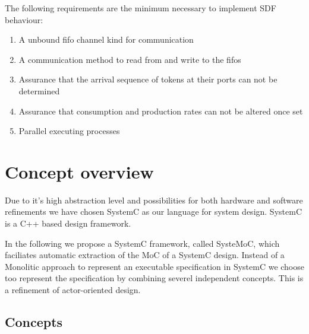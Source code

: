 The following requirements are the minimum necessary to
implement SDF behaviour:

\begin{enumerate}
\item A unbound fifo channel kind for communication
\item A communication method to read from and write to the fifos
\item Assurance that the arrival sequence of tokens at
      their ports can not be determined
\item Assurance that consumption and production rates can not
      be altered once set
\item Parallel executing processes
\end{enumerate}


\section{Concept overview}

Due to it's high abstraction level and possibilities for both
hardware and software refinements we have chosen SystemC
\cite{systemc-lrm:2003} \cite{glms:2002} as our language for system design.
SystemC is a C++ based design framework.

In the following we propose a SystemC framework, called SysteMoC, which
faciliates automatic extraction of the MoC of a SystemC design.
Instead of a Monolitic approach to represent an executable specification
in SystemC we choose too represent the specification
by combining severel independent concepts. This is a refinement of
actor-oriented design.

\subsection{Concepts}

